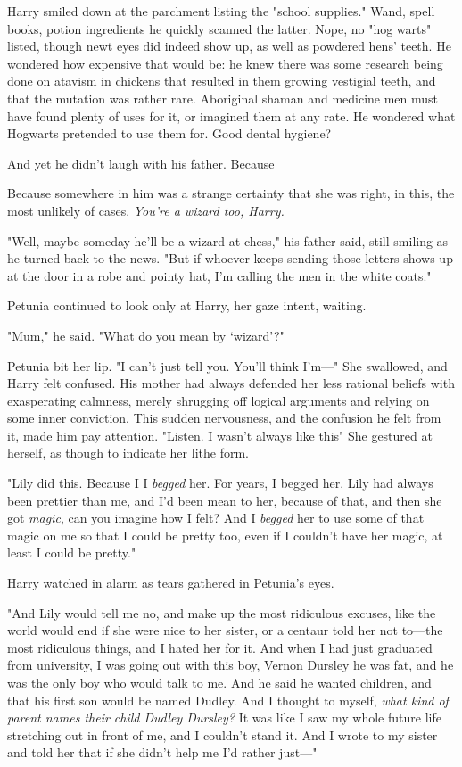 Harry smiled down at the parchment listing the "school
supplies." Wand, spell books, potion ingredients{\el} he quickly
scanned the latter. Nope, no "hog warts" listed, though
newt eyes did indeed show up, as well as powdered hens'
teeth. He wondered how expensive that would be: he
knew there was some research being done on atavism in
chickens that resulted in them growing vestigial teeth, and
that the mutation was rather rare. Aboriginal shaman and
medicine men must have found plenty of uses for it, or
imagined them at any rate. He wondered what Hogwarts
pretended to use them for. Good dental hygiene?

And yet he didn't laugh with his father. Because{\el}

Because somewhere in him was a strange certainty that
she was right, in this, the most unlikely of cases.
\emph{You're a wizard too, Harry.}

"Well, maybe someday he'll be a wizard at chess," his
father said, still smiling as he turned back to the news.
"But if whoever keeps sending those letters shows up at
the door in a robe and pointy hat, I'm calling the men in
the white coats."

Petunia continued to look only at Harry, her gaze intent,
waiting.

"Mum," he said. "What do you mean by `wizard'?"

Petunia bit her lip. "I can't just tell you. You'll think I'm—"
She swallowed, and Harry felt confused. His mother had
always defended her less rational beliefs with
exasperating calmness, merely shrugging off logical arguments
and relying on some inner conviction. This sudden
nervousness, and the confusion he felt from it, made him
pay attention. "Listen. I wasn't{\el} always like this{\el}" She
gestured at herself, as though to indicate her lithe form.

"Lily did this. Because I{\el} I \emph{begged} her. For years, I
begged her. Lily had always been prettier than me, and
I'd{\el} been mean to her, because of that, and then she
got \emph{magic}, can you imagine how I felt? And I \emph{begged} her
to use some of that magic on me so that I could be
pretty too, even if I couldn't have her magic, at least I
could be pretty."

Harry watched in alarm as tears gathered in Petunia's eyes.

"And Lily would tell me no, and make up the most
ridiculous excuses, like the world would end if she were
nice to her sister, or a centaur told her not to—the most
ridiculous things, and I hated her for it. And when I had
just graduated from university, I was going out with this
boy, Vernon Dursley{\el} he was fat, and he was the only boy
who would talk to me. And he said he wanted children,
and that his first son would be named Dudley. And I
thought to myself, \emph{what kind of parent names their child
Dudley Dursley?} It was like I saw my whole future life
stretching out in front of me, and I couldn't stand it. And
I wrote to my sister and told her that if she didn't help
me I'd rather just—"

